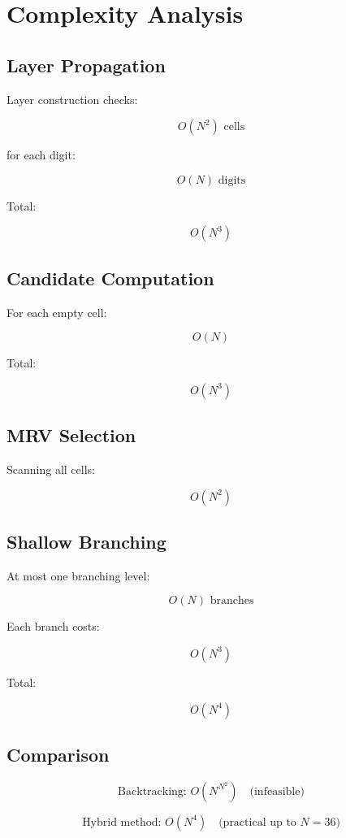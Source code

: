 \documentclass[11pt]{article}
\begin{document}
\section{Complexity Analysis}

\subsection{Layer Propagation}
Layer construction checks:


\[
O(N^2) \text{ cells}
\]


for each digit:


\[
O(N) \text{ digits}
\]


Total:


\[
O(N^3)
\]



\subsection{Candidate Computation}
For each empty cell:


\[
O(N)
\]


Total:


\[
O(N^3)
\]



\subsection{MRV Selection}
Scanning all cells:


\[
O(N^2)
\]



\subsection{Shallow Branching}
At most one branching level:


\[
O(N) \text{ branches}
\]


Each branch costs:


\[
O(N^3)
\]


Total:


\[
O(N^4)
\]



\subsection{Comparison}


\[
\text{Backtracking: } O(N^{N^2}) \quad\text{(infeasible)}
\]




\[
\text{Hybrid method: } O(N^4) \quad\text{(practical up to } N=36)
\]
\end{document}
